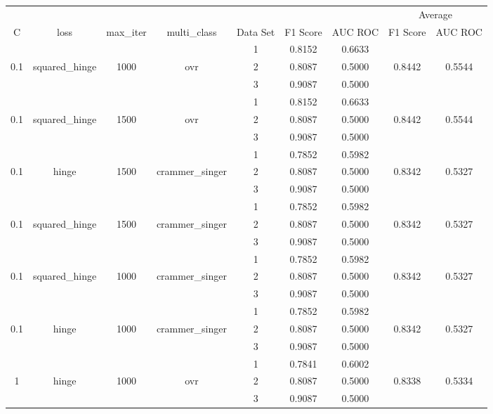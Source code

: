 \documentclass[12pt, twoside]{article}
\begin{document}
\begin{landscape}
\begin{table}[!htbp]
  \centering
  \begin{tabular}{ccccccccc}
  \toprule
  {}	&	{}	&	{}	&	{}	&	{}	&	{}	&	{}	&	\multicolumn{2}{c}{Average} \\
  \cmidrule(r){8-9}
  C	&	loss	&	max\_iter	&	multi\_class	&	Data Set	&	F1 Score	&	AUC ROC	&	F1 Score	&	AUC ROC \\
  \midrule
  	&	&	&	&	1	&	0.8152	&	0.6633	&		&	 \\
  0.1	&	squared\_hinge	&	1000	&	ovr	&	2	&	0.8087	&	0.5000	&	0.8442	&	0.5544 \\
  	&	&	&	&	3	&	0.9087	&	0.5000	&		&	 \\
  	\cmidrule(r){5-9}
  	&	&	&	&	1	&	0.8152	&	0.6633	&		&	 \\
  0.1	&	squared\_hinge	&	1500	&	ovr	&	2	&	0.8087	&	0.5000	&	0.8442	&	0.5544 \\
  	&	&	&	&	3	&	0.9087	&	0.5000	&		&	 \\
  	\cmidrule(r){5-9}
  	&	&	&	&	1	&	0.7852	&	0.5982	&		&	 \\
  0.1	&	hinge	&	1500	&	crammer\_singer	&	2	&	0.8087	&	0.5000	&	0.8342	&	0.5327 \\
  	&	&	&	&	3	&	0.9087	&	0.5000	&		&	 \\
  	\cmidrule(r){5-9}
  	&	&	&	&	1	&	0.7852	&	0.5982	&		&	 \\
  0.1	&	squared\_hinge	&	1500	&	crammer\_singer	&	2	&	0.8087	&	0.5000	&	0.8342	&	0.5327 \\
  	&	&	&	&	3	&	0.9087	&	0.5000	&		&	 \\
  	\cmidrule(r){5-9}
  	&	&	&	&	1	&	0.7852	&	0.5982	&		&	 \\
  0.1	&	squared\_hinge	&	1000	&	crammer\_singer	&	2	&	0.8087	&	0.5000	&	0.8342	&	0.5327 \\
  	&	&	&	&	3	&	0.9087	&	0.5000	&		&	 \\
  	\cmidrule(r){5-9}
  	&	&	&	&	1	&	0.7852	&	0.5982	&		&	 \\
  0.1	&	hinge	&	1000	&	crammer\_singer	&	2	&	0.8087	&	0.5000	&	0.8342	&	0.5327 \\
  	&	&	&	&	3	&	0.9087	&	0.5000	&		&	 \\
  	\cmidrule(r){5-9}
  	&	&	&	&	1	&	0.7841	&	0.6002	&		&	 \\
  1	&	hinge	&	1000	&	ovr	&	2	&	0.8087	&	0.5000	&	0.8338	&	0.5334 \\
  	&	&	&	&	3	&	0.9087	&	0.5000	&		&	 \\
  	\cmidrule(r){5-9}

\end{tabular}
\end{table}
\end{landscape}
\end{document}
